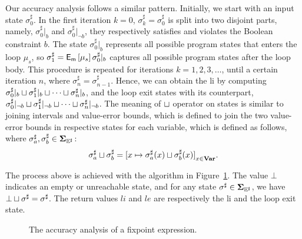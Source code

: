 Our accuracy analysis follows a similar pattern.  Initially, we start
with an input state $\sigma^\sharp_0$.  In the first iteration $k = 0$,
$\sigma^\sharp_k = \sigma^\sharp_0$ is split into two disjoint parts,
namely, $\sigma^\sharp_0|_b$ and $\sigma^\sharp_0|_{\neg b}$, they
respectively satisfies and violates the Boolean constraint $b$.  The state
$\sigma^\sharp_0|_b$ represents all possible program states that enters the
loop $\mu_s$, so $\sigma^\sharp_1 = \operatorname{\mathsf{E}_\mathsf{m}}\left[{\mu_s}\right]{\sigma^\sharp_0|_b}$
captures all possible program states after the loop body.  This procedure
is repeated for iterations $k = 1, 2, 3, \ldots$, until a certain iteration
$n$, where $\sigma^\sharp_n = \sigma^\sharp_{n-1}$.  Hence, we can obtain the
\gls{li} by computing $\sigma^\sharp_0|_b \sqcup \sigma^\sharp_1|_b \sqcup \cdots
\sqcup \sigma^\sharp_n|_b$, and the loop exit states with its counterpart,
\ie~$\sigma^\sharp_0|_{\neg b} \sqcup \sigma^\sharp_1|_{\neg b} \sqcup \cdots
\sqcup \sigma^\sharp_n|_{\neg b}$.  The meaning of $\sqcup$ operator on states is
similar to joining intervals and value-error bounds, which is defined to join
the two value-error bounds in respective states for each variable, which is
defined as follows, where $\sigma^\sharp_a, \sigma^\sharp_b \in \mathbf{\Sigma}_{\mathbb{E}^\sharp}$:
\begin{equation}
    \sigma^\sharp_a \join \sigma^\sharp_b =
        {%
            [ x \mapsto \sigma^\sharp_a(x) \join \sigma^\sharp_b(x) ]
        }_{x \in \varset}.
\end{equation}

The process above is achieved with the algorithm in Figure~\ref{po:alg:fix}.
The value $\bot$ indicates an empty or unreachable state, and for any
state $\sigma^\sharp \in \mathbf{\Sigma}_{\mathbb{E}^\sharp}$, we have $\bot \sqcup \sigma^\sharp =
\sigma^\sharp$.  The return values $li$ and $le$ are respectively the \gls{li}
and the loop exit state.
\begin{figure}[ht]
    \centering
    \newcommand{\statett}{\ensuremath\sigma^\sharp_{\mathrm{tt}}}
    \newcommand{\stateff}{\ensuremath\sigma^\sharp_{\mathrm{ff}}}
    \begin{algorithmic}
            \Loop%
                \State{$\statett \gets \sigma^\sharp_k|_b$;}
                \State{$\stateff \gets \sigma^\sharp_k|_{\neg b}$}
                \State{$li \gets li \join \statett$;}
                \State{$le \gets le \join \stateff$}
                \EndIf%
            \EndLoop%
        \EndFunction%
    \end{algorithmic}
    \caption{%
        The accuracy analysis of a fixpoint expression.}\label{po:alg:fix}
\end{figure}

